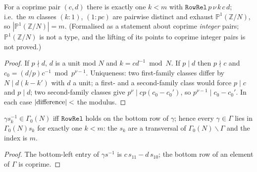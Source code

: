 \begin{lemma}\label{prop:cosets-rowclass}
  \leanok
  For a coprime pair $(c,d)$ there is exactly one $k<m$ with $\texttt{RowRel}\,p\,\nu\,k\,c\,d$; i.e.\ the $m$ classes
  $(k:1)$, $(1:pc)$ are pairwise distinct and exhaust $\mathbb P^1(\mathbb Z/N)$, so $|\mathbb P^1(\mathbb Z/N)|=m$. (Formalised as a statement about coprime \emph{integer} pairs; $\mathbb P^1(\mathbb Z/N)$ is not a type, and the lifting of its points to coprime integer pairs is not proved.)
\end{lemma}
\begin{proof}
  \leanok
  If $p\nmid d$, $d$ is a unit mod $N$ and $k=cd^{-1}\bmod N$. If $p\mid d$ then $p\nmid c$ and $c_0=(d/p)c^{-1}\bmod
  p^{\nu-1}$. Uniqueness: two first-family classes differ by $N\mid d(k-k')$ with $d$ a unit; a first- and a second-family
  class would force $p\mid c$ and $p\mid d$; two second-family classes give $p^{\nu}\mid cp(c_0-c_0')$, so
  $p^{\nu-1}\mid c_0-c_0'$. In each case $|{\rm difference}|<$ the modulus.
\end{proof}

\begin{proposition}\label{prop:cosets-4}
  \leanok
  $\gamma s_k^{-1}\in\Gamma_0(N)$ iff $\texttt{RowRel}$ holds on the bottom row of $\gamma$; hence every $\gamma\in\Gamma$ lies
  in $\Gamma_0(N)s_k$ for exactly one $k<m$: the $s_k$ are a transversal of $\Gamma_0(N)\backslash\Gamma$ and the index is $m$.
\end{proposition}
\begin{proof}
  \leanok
  The bottom-left entry of $\gamma s^{-1}$ is $c\,s_{11}-d\,s_{10}$; the bottom row of an element of $\Gamma$ is coprime.
\end{proof}

